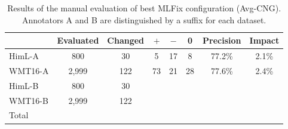 \begin{table}[t]
\centering
\small
{}
\caption{
	Final evaluation of Englsh-German configuration of MLFix. Majority-CNG and Avg-CNG methods were compared
with the best English-Czech configuration.
}
\label{final_de-summary}
\end{table}


\begin{table}[t]
\centering
\small

\begin{tabular}{l|cc|ccc|cc}
  &  Evaluated  &  Changed  &  $+$  &  $-$  &  0  &  Precision  &  Impact  \\
\hline
HimL-A  &  800  &  30  &  5  &  17  &  8  &  77.2\%  &  2.1\%  \\
WMT16-A  &  2,999  &  122  &  73  &  21  &  28  &  77.6\%  &  2.4\%  \\
HimL-B  &  800  &  30  &    &    &    &    &    \\
WMT16-B  &  2,999  &  122  &    &    &    &    &    \\
\hline
Total & & & & & & & \\
\end{tabular}
\caption{
Results of the manual evaluation of best MLFix configuration (Avg-CNG). Annotators
A and B are distinguished by a suffix for each dataset.
}
\label{maneval-final}
\end{table}
 
